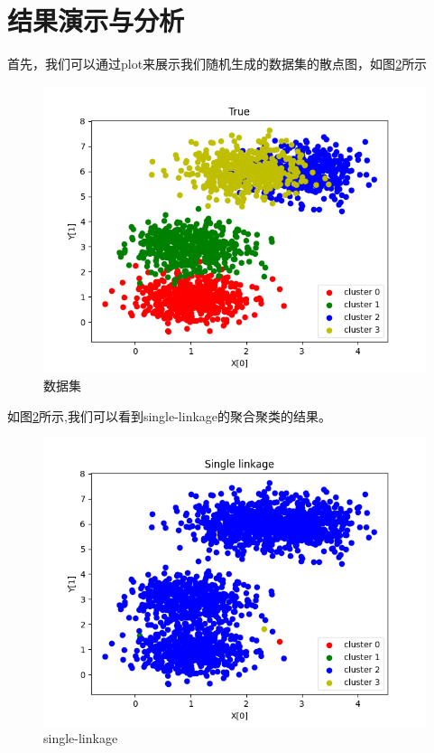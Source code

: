\documentclass[UTF8,a4paper,10pt]{ctexart}
\begin{document}
\section{结果演示与分析}

首先，我们可以通过plot来展示我们随机生成的数据集的散点图，如图\ref{fig:1}所示
\begin{figure}[H]
    \centering
    \includegraphics[scale=0.7]{1.png}
    \caption{数据集}
    \label{fig:1}
\end{figure}

如图\ref{fig:1}所示,我们可以看到single-linkage的聚合聚类的结果。

\begin{figure}[H]
    \centering
    \includegraphics[scale=0.7]{2.png}
    \caption{single-linkage}
    \label{fig:1}
\end{figure}
\end{document}
